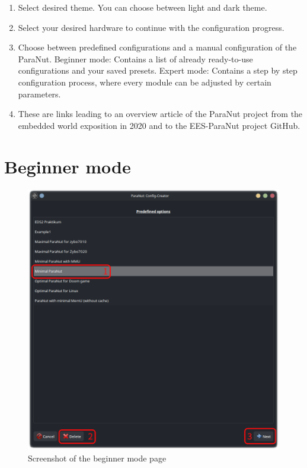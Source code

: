 \begin{enumerate}
	\item Select desired theme. You can choose between light and dark theme.
	\item Select your desired hardware to continue with the configuration progress.
	\item Choose between predefined configurations and a manual configuration of the ParaNut.
Beginner mode:
Contains a list of already \glqq ready-to-use\grqq{} configurations and your saved presets.
Expert mode:
Contains a step by step configuration process, where every module can be adjusted by certain parameters.
	\item These are links leading to an overview article of the ParaNut project from the embedded world exposition in 2020 and to the EES-ParaNut project GitHub.
\end{enumerate}

\newpage
\section{Beginner mode}

\begin{figure}[!h]
    \noindent \begin{centering}
        \includegraphics[width=15cm]{images/auto_page}
        \par\end{centering}
    \caption{Screenshot of the beginner mode page}
\end{figure}

